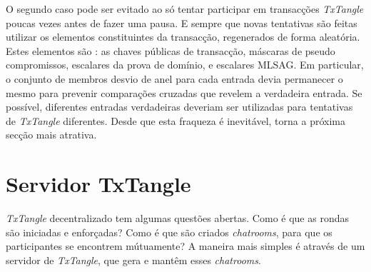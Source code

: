 
O segundo caso pode ser evitado ao só tentar participar em transacções {\em TxTangle} poucas vezes antes de fazer uma pausa. E sempre que novas tentativas são feitas utilizar os elementos constituintes da transacção, regenerados de forma aleatória. Estes elementos são : as chaves públicas de transacção, máscaras de pseudo compromissos, escalares da prova de domínio, e escalares MLSAG. Em particular, o conjunto de membros desvio de anel para cada entrada devia permanecer o mesmo para prevenir comparações cruzadas que revelem a verdadeira entrada. Se possível, diferentes entradas verdadeiras deveriam ser utilizadas para tentativas de {\em TxTangle} diferentes. Desde que esta fraqueza é inevitável, torna a próxima secção mais atrativa.    




\section{Servidor TxTangle}
\label{sec:hosted-txtangle}

{\em TxTangle} decentralizado tem algumas questões abertas. Como é que as rondas são iniciadas e enforçadas? Como é que são criados {\em chatrooms}, para que os participantes se encontrem mútuamente? A maneira mais simples é através de um servidor de {\em TxTangle}, que gera e mantêm esses {\em chatrooms}. 

